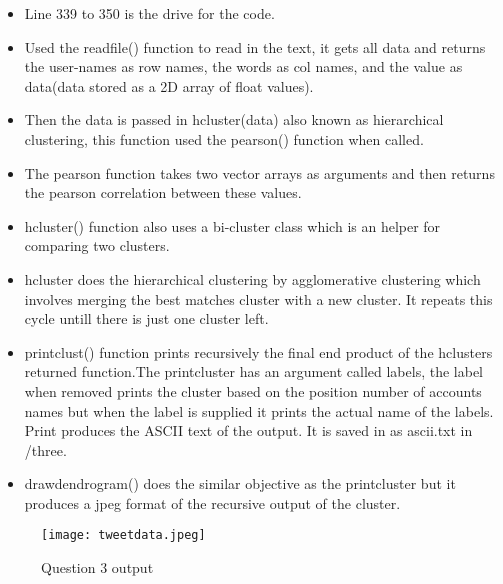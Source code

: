 \documentclass[12pt]{article}
\begin{document}
\begin{itemize}
\item Line 339 to 350 is the drive for the code.



\item Used the readfile() function to read in the text, it gets all data and returns the user-names as row names, the words as col names, and the value as data(data stored as a 2D array
of float values).

\item  Then the data is passed in hcluster(data) also known as  hierarchical clustering, this function used the pearson() function when called.

\item The pearson function takes two vector arrays as arguments and then returns the pearson correlation between these values.

\item hcluster() function also uses a bi-cluster class which is an helper for comparing two clusters.

\item hcluster does the hierarchical clustering by agglomerative clustering which involves merging the best matches cluster with a new cluster. It repeats this cycle untill there is just one cluster left.

\item printclust() function prints recursively the final end product of the hclusters returned function.The printcluster has an argument called labels, the label when removed prints the cluster based on the position number of accounts names but when the label is supplied it prints the actual name of the labels. Print produces the ASCII text of the output. It is saved in as ascii.txt in /three.

\item drawdendrogram() does the similar objective as the printcluster but it produces a jpeg format of the recursive output of the cluster.

\end{itemize}

\clearpage
\begin{figure}[h]
\centering
\texttt{[image: tweetdata.jpeg]}
\caption{ Question 3 output}
\label{fig}
\end{figure}
\clearpage
\end{document}
